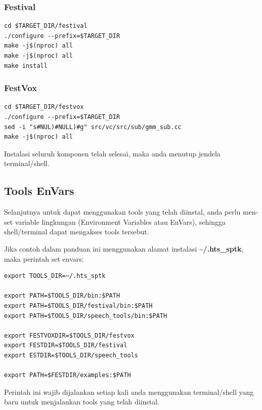 \documentclass[12pt,]{article}
\begin{document}
	\subsubsection{Festival}
	\begin{verbatim}
cd $TARGET_DIR/festival
./configure --prefix=$TARGET_DIR
make -j$(nproc) all
make -j$(nproc) all
make install
	\end{verbatim}

	\subsubsection{FestVox}
	\begin{verbatim}
cd $TARGET_DIR/festvox
./configure --prefix=$TARGET_DIR
sed -i "s#NUL)#NULL)#g" src/vc/src/sub/gmm_sub.cc
make -j$(nproc) all
	\end{verbatim}

	Instalasi seluruh komponen telah selesai, maka anda menutup jendela terminal/shell.

	\newpage
	\subsection{Tools EnVars}

	Selanjutnya untuk dapat menggunakan tools yang telah diinstal,
	anda perlu men-set variable lingkungan (Environment Variables atau EnVars),
	sehingga shell/terminal dapat mengakses tools tersebut.

	Jika contoh dalam panduan ini menggunakan alamat instalasi \textbf{\textasciitilde/.hts\_sptk},
	maka perintah set envars:

	\begin{verbatim}
export TOOLS_DIR=~/.hts_sptk

export PATH=$TOOLS_DIR/bin:$PATH
export PATH=$TOOLS_DIR/festival/bin:$PATH
export PATH=$TOOLS_DIR/speech_tools/bin:$PATH

export FESTVOXDIR=$TOOLS_DIR/festvox
export FESTDIR=$TOOLS_DIR/festival
export ESTDIR=$TOOLS_DIR/speech_tools

export PATH=$FESTDIR/examples:$PATH
	\end{verbatim}

	Perintah ini wajib dijalankan setiap kali anda menggunakan terminal/shell yang baru untuk menjalankan tools yang telah diinstal.
\end{document}
